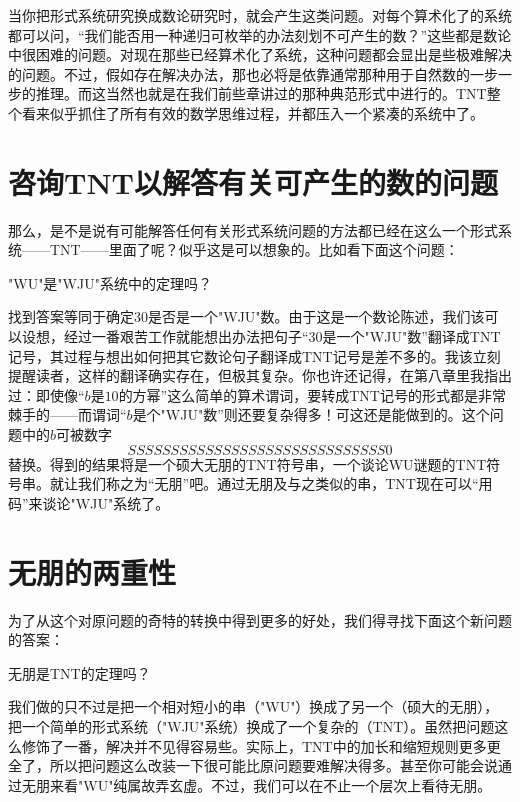 当你把形式系统研究换成数论研究时，就会产生这类问题。对每个算术化了的系统都可以问，“我们能否用一种递归可枚举的办法刻划不可产生的数？”这些都是数论中很困难的问题。对现在那些已经算术化了系统，这种问题都会显出是些极难解决的问题。不过，假如存在解决办法，那也必将是依靠通常那种用于自然数的一步一步的推理。而这当然也就是在我们前些章讲过的那种典范形式中进行的。TNT整个看来似乎抓住了所有有效的数学思维过程，并都压入一个紧凑的系统中了。

\section{咨询TNT以解答有关可产生的数的问题}

那么，是不是说有可能解答任何有关形式系统问题的方法都已经在这么一个形式系统——TNT——里面了呢？似乎这是可以想象的。比如看下面这个问题：

\begin{block}
"WU"是"WJU"系统中的定理吗？
\end{block}
找到答案等同于确定$30$是否是一个"WJU"数。由于这是一个数论陈述，我们该可以设想，经过一番艰苦工作就能想出办法把句子“$30$是一个"WJU"数”翻译成TNT记号，其过程与想出如何把其它数论句子翻译成TNT记号是差不多的。我该立刻提醒读者，这样的翻译确实存在，但极其复杂。你也许还记得，在第八章里我指出过：即使像“$b$是$10$的方幂”这么简单的算术谓词，要转成TNT记号的形式都是非常棘手的——而谓词“$b$是个"WJU"数”则还要复杂得多！可这还是能做到的。这个问题中的$b$可被数字
\[
SSSSSSSSSSSSSSSSSSSSSSSSSSSSSS0
\]
替换。得到的结果将是一个硕大无朋的TNT符号串，一个谈论WU谜题的TNT符号串。就让我们称之为“无朋”吧。通过无朋及与之类似的串，TNT现在可以“用码”来谈论"WJU"系统了。

\section{无朋的两重性}

为了从这个对原问题的奇特的转换中得到更多的好处，我们得寻找下面这个新问题的答案：

\begin{block}
无朋是TNT的定理吗？
\end{block}

我们做的只不过是把一个相对短小的串（"WU"）换成了另一个（硕大的无朋），把一个简单的形式系统（"WJU"系统）换成了一个复杂的（TNT）。虽然把问题这么修饰了一番，解决并不见得容易些。实际上，TNT中的加长和缩短规则更多更全了，所以把问题这么改装一下很可能比原问题要难解决得多。甚至你可能会说通过无朋来看"WU"纯属故弄玄虚。不过，我们可以在不止一个层次上看待无朋。

